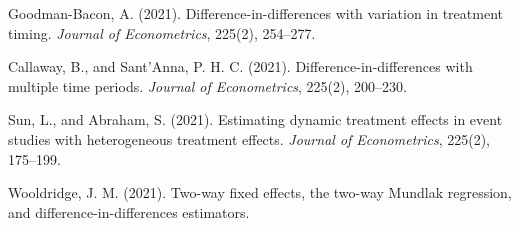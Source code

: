 \documentclass[11pt]{article}
\begin{document}
Goodman-Bacon, A. (2021). Difference-in-differences with variation in treatment
timing. \emph{Journal of Econometrics}, 225(2), 254--277.

Callaway, B., and Sant'Anna, P. H. C. (2021). Difference-in-differences with
multiple time periods. \emph{Journal of Econometrics}, 225(2), 200--230.

Sun, L., and Abraham, S. (2021). Estimating dynamic treatment effects in event
studies with heterogeneous treatment effects. \emph{Journal of Econometrics},
225(2), 175--199.

Wooldridge, J. M. (2021). Two-way fixed effects, the two-way Mundlak regression,
and difference-in-differences estimators.
\end{document}
